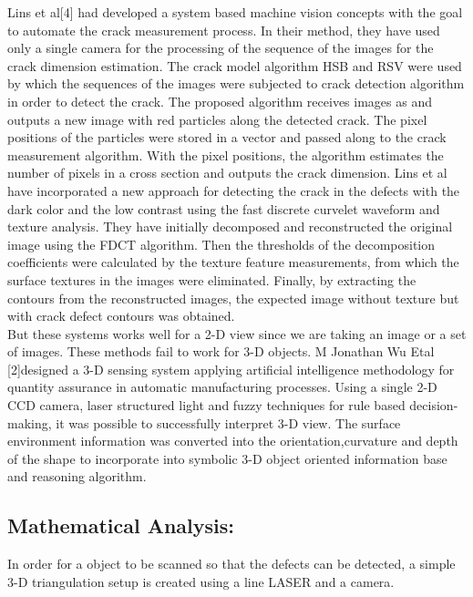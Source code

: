 \documentclass[12pt]{article}
\begin{document}
\null{\quad}Lins et al[4] had developed a system based machine vision concepts with the goal to automate the crack measurement process. In their method, they have used only a single camera for the processing of the sequence of the images for the crack dimension estimation. The crack model algorithm HSB and RSV were used by which the sequences of the images were subjected to crack detection algorithm in order to detect the crack. The proposed algorithm receives images as and outputs a new image with red particles along the detected crack. The pixel positions of the particles were stored in a vector and passed along to the crack measurement algorithm. With the pixel positions, the algorithm estimates the number of pixels in a cross section and outputs the crack dimension. Lins et al have incorporated a new approach for detecting the crack in the defects with the dark color and the low contrast using the fast discrete curvelet waveform and texture analysis. They have initially decomposed and reconstructed the original image using the FDCT algorithm. Then the thresholds of the decomposition coefficients were calculated by the texture feature measurements, from which the surface textures in the images were eliminated. Finally, by extracting the contours from the reconstructed images, the expected image without texture but with crack defect contours was obtained.\\

\null{\quad}But these systems works well for a 2-D view since we are taking an image or a set of images. These methods fail to work for 3-D objects. M Jonathan Wu Etal [2]designed a 3-D sensing system applying artificial intelligence methodology for quantity assurance in automatic manufacturing processes. Using a single 2-D CCD camera, laser structured light and fuzzy techniques for rule based decision-making, it was possible to successfully interpret 3-D view. The surface environment information was converted into the orientation,curvature and depth of the shape to incorporate into symbolic 3-D object oriented information base and reasoning algorithm.\\




\subsection{Mathematical Analysis:}
{\quad}In order for a object to be scanned so that the defects can be detected, a simple 3-D triangulation setup is created using a line LASER and a camera.\\
\end{document}
